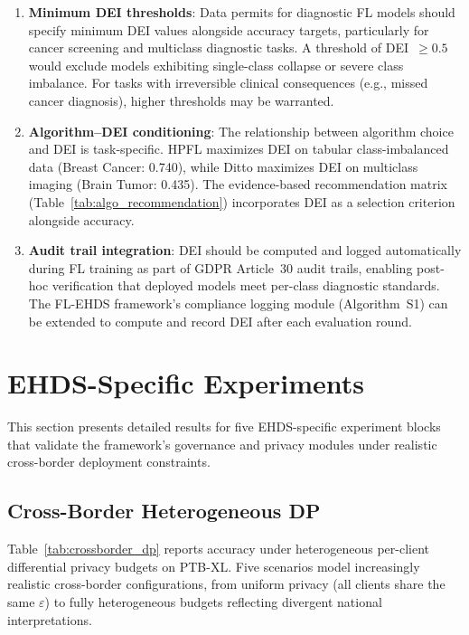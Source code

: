 \documentclass[conference,a4paper]{IEEEtran}
\begin{document}
\begin{enumerate}
    \item \textbf{Minimum DEI thresholds}: Data permits for diagnostic FL models should specify minimum DEI values alongside accuracy targets, particularly for cancer screening and multiclass diagnostic tasks. A threshold of DEI~$\geq 0.5$ would exclude models exhibiting single-class collapse or severe class imbalance. For tasks with irreversible clinical consequences (e.g., missed cancer diagnosis), higher thresholds may be warranted.
    \item \textbf{Algorithm--DEI conditioning}: The relationship between algorithm choice and DEI is task-specific. HPFL maximizes DEI on tabular class-imbalanced data (Breast Cancer: 0.740), while Ditto maximizes DEI on multiclass imaging (Brain Tumor: 0.435). The evidence-based recommendation matrix (Table~\ref{tab:algo_recommendation}) incorporates DEI as a selection criterion alongside accuracy.
    \item \textbf{Audit trail integration}: DEI should be computed and logged automatically during FL training as part of GDPR Article~30 audit trails, enabling post-hoc verification that deployed models meet per-class diagnostic standards. The FL-EHDS framework's compliance logging module (Algorithm~S1) can be extended to compute and record DEI after each evaluation round.
\end{enumerate}

\section{EHDS-Specific Experiments}
\label{sec:ehds_experiments}

This section presents detailed results for five EHDS-specific experiment blocks that validate the framework's governance and privacy modules under realistic cross-border deployment constraints.

\subsection{Cross-Border Heterogeneous DP}
\label{sec:crossborder_dp}

Table~\ref{tab:crossborder_dp} reports accuracy under heterogeneous per-client differential privacy budgets on PTB-XL. Five scenarios model increasingly realistic cross-border configurations, from uniform privacy (all clients share the same $\varepsilon$) to fully heterogeneous budgets reflecting divergent national interpretations.
\end{document}
